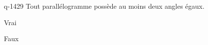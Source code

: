 \begin{truefalse}{q-1429}
Tout parallélogramme possède au moins deux angles égaux.
\item* Vrai
\item Faux
\end{truefalse}

